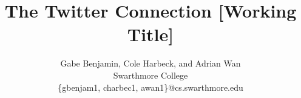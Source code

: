 \documentclass{sig-alternate}
\begin{document}
\date{}

\title{The Twitter Connection [Working Title]}

\author{
    Gabe Benjamin, Cole Harbeck, and Adrian Wan\\
    Swarthmore College\\
    \{gbenjam1, charbec1, awan1\}@cs.swarthmore.edu
}

\maketitle


% 
% 
% 
% 
% 
% 
% 


\balance
\end{document}
